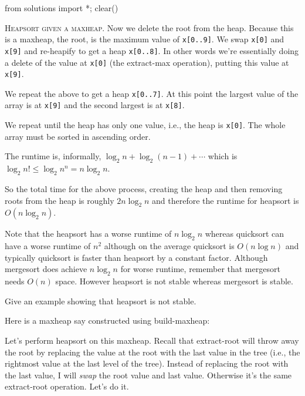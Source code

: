 
\begin{python0}
from solutions import *; clear()
\end{python0}

\textsc{Heapsort given a maxheap.}
Now we delete the root from the heap.
Because this is a maxheap, the root, is the 
maximum value of \verb!x[0..9]!.
We swap \verb!x[0]! and \verb!x[9]!
and re-heapify to get a heap \verb!x[0..8]!.
In other words we're essentially doing a delete of the value at \verb!x[0]!
(the extract-max operation), putting this value at \texttt{x[9]}.

We repeat the above to get a heap \verb!x[0..7]!.
At this point the largest value of the array is at \verb!x[9]!
and the second largest is at \verb!x[8]!.

We repeat until the heap has only one value, i.e., the heap is \verb!x[0]!.
The whole array must be sorted in ascending order.

The runtime is, informally, $\log_2 n + \log_2 (n - 1) + \cdots$
which is $\log_2 n! \leq \log_2 n^n = n \log_2 n$.

So the total time for the above process,
creating the heap and then removing roots from the 
heap is roughly $2 n \log_2 n$ and therefore
the runtime for heapsort is $O(n \log_2 n)$.

Note that the heapsort has a worse runtime of $n \log_2 n$
whereas quicksort can have a worse runtime of $n^2$
although
on the average quicksort is $O(n \log n)$ and 
typically quicksort is faster than heapsort by a constant
factor.
Although mergesort does achieve $n \log_2 n$ for worse runtime,
remember that mergesort needs $O(n)$ space.
However heapsort is not stable whereas mergesort is stable.

\begin{ex}
  Give an example showing that heapsort is not
  stable.
\end{ex}
  
  

\newpage
Here is a maxheap say constructed
using build-maxheap:



Let's perform heapsort on this maxheap.
Recall that extract-root will throw away the root by replacing
the value at the root with the last value in the tree (i.e.,
the rightmost value at the last level of the tree).
Instead of replacing the root with the last value,
I will \textit{swap} the root value and last value.
Otherwise it's the same extract-root operation.
Let's do it.



